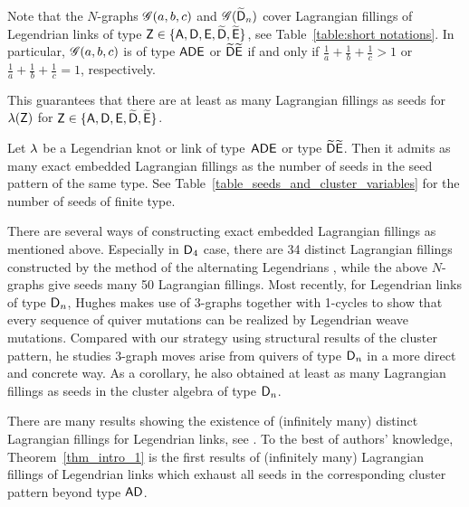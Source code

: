 Note that the $N$-graphs $\mathscr{G}(a,b,c)$ and $\mathscr{G}(\widetilde{\mathsf{D}}_{n})$ cover Lagrangian fillings of Legendrian links of type $\mathsf{Z}\in\{\mathsf{A},\mathsf{D},\mathsf{E},\widetilde{\mathsf{D}},\widetilde{\mathsf{E}}\}$, see Table~\ref{table:short notations}.
In particular, $\mathscr{G}(a,b,c)$ is of type $\mathsf{ADE}$ or $\widetilde{\mathsf{D}}\widetilde{\mathsf{E}}$ if and only if $\frac 1a+\frac 1b+\frac 1c>1$ or $\frac 1a+\frac 1b+\frac 1c=1$, respectively.

This guarantees that there are at least as many Lagrangian fillings as seeds for $\lambda(\mathsf{Z})$ for $\mathsf{Z}\in\{\mathsf{A},\mathsf{D},\mathsf{E},\widetilde{\mathsf{D}},\widetilde{\mathsf{E}}\}$.


\begin{theorem}\label{thm_intro_1}
Let $\lambda$ be a Legendrian knot or link of type~$\mathsf{ADE}$ or type $\widetilde{\mathsf{D}}\widetilde{\mathsf{E}}$.
Then it admits as many exact embedded Lagrangian fillings as the number of seeds in the seed pattern of the same type.
See Table~\ref{table_seeds_and_cluster_variables} for the number of seeds of finite type. 
\end{theorem}

There are several ways of constructing exact embedded Lagrangian fillings as mentioned above.
Especially in $\mathsf{D}_4$ case, there are 34 distinct Lagrangian fillings constructed by the method of the alternating Legendrians \cite{BFFH2018,STWZ2019},
while the above $N$-graphs give seeds many 50 Lagrangian fillings.
Most recently, for Legendrian links of type $\mathsf{D}_n$, Hughes \cite{Hughes2021} makes use of $3$-graphs together with 1-cycles to show that every sequence of quiver mutations can be realized by Legendrian weave mutations. Compared with our strategy using structural results of the cluster pattern, he studies $3$-graph moves arise from quivers of type $\mathsf{D}_n$ in a more direct and concrete way. As a corollary, he also obtained at least as many Lagrangian fillings as seeds in the cluster algebra of type $\mathsf{D}_n$.

There are many results showing the existence of (infinitely many) distinct Lagrangian fillings for Legendrian links, see \cite{EHK2016,Pan2017,TZ2018,STWZ2019,CG2020,CZ2020,GSW2020b,CN2021}. To the best of authors' knowledge, Theorem~\ref{thm_intro_1} is the first results of (infinitely many) Lagrangian fillings of Legendrian links which exhaust all seeds in the corresponding cluster pattern beyond type $\mathsf{A}\mathsf{D}$.

